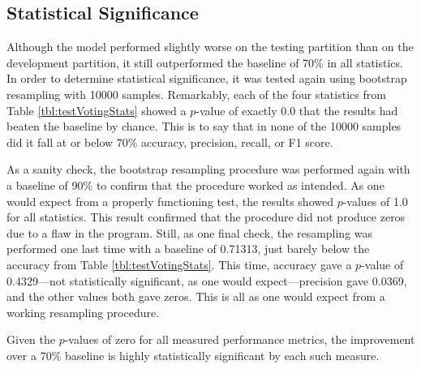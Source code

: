 \documentclass{article}
\begin{document}
\subsection*{Statistical Significance}

Although the model performed slightly worse on the testing partition than on the development partition, it still outperformed the baseline of 70\% in all statistics. In order to determine statistical significance, it was tested again using bootstrap resampling with 10000 samples. Remarkably, each of the four statistics from Table \ref{tbl:testVotingStats} showed a $p$-value of exactly 0.0 that the results had beaten the baseline by chance. This is to say that in none of the 10000 samples did it fall at or below 70\% accuracy, precision, recall, or F1 score.

As a sanity check, the bootstrap resampling procedure was performed again with a baseline of 90\% to confirm that the procedure worked as intended. As one would expect from a properly functioning test, the results showed $p$-values of 1.0 for all statistics. This result confirmed that the procedure did not produce zeros due to a flaw in the program. Still, as one final check, the resampling was performed one last time with a baseline of 0.71313, just barely below the accuracy from Table \ref{tbl:testVotingStats}. This time, accuracy gave a $p$-value of 0.4329---not statistically significant, as one would expect---precision gave 0.0369, and the other values both gave zeros. This is all as one would expect from a working resampling procedure.

Given the $p$-values of zero for all measured performance metrics, the improvement over a 70\% baseline is highly statistically significant by each such measure.
\end{document}
